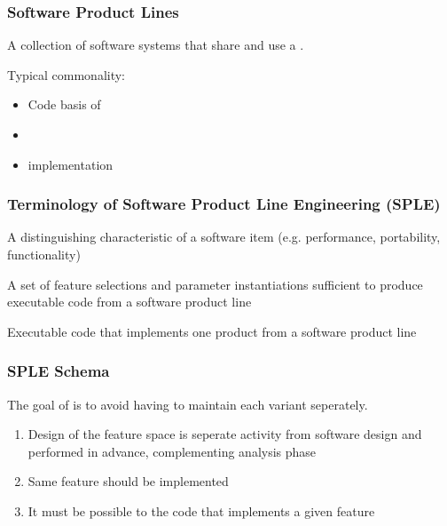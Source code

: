 \documentclass[
    ../../Software_Engineering_Summary.tex,
]
{subfiles}
\begin{document}
\subsubsection{Software Product Lines}
\begin{defbox}
    A collection of software systems that share  and use a .
\end{defbox}

Typical commonality:
\begin{itemize}
    \item Code basis of 
    \item {}
    \item implementation 
\end{itemize}

\subsubsection{Terminology of Software Product Line Engineering (SPLE)}
\begin{defbox}
    A distinguishing characteristic of a software item (e.g. performance, portability, functionality)
\end{defbox}

\begin{defbox}
    [Product]
    A set of feature selections and parameter instantiations sufficient to produce executable code from a software product line
\end{defbox}

\begin{defbox}
    [Variant]
    Executable code that implements one product from a software product line
\end{defbox}

\subsubsection{SPLE Schema}
The goal of  is to avoid having to maintain each variant seperately.

\begin{defbox}
    \begin{enumerate}
        \item Design of the feature space is seperate activity from software design and performed in advance, complementing analysis phase
        \item Same feature should be implemented 
        \item It must be possible to  the code that implements a given feature
    \end{enumerate}
\end{defbox}
\end{document}
